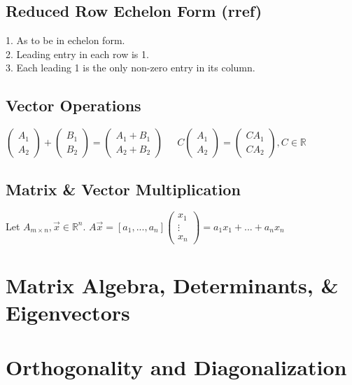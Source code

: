 \documentclass[5pt]{article}
\begin{document}
\begin{multicols}{2}
\subsection{Reduced Row Echelon Form (rref)}
1. As to be in echelon form. \\
2. Leading entry in each row is 1. \\
3. Each leading 1 is the only non-zero entry in its column. \\

\subsection{Vector Operations}
$\begin{pmatrix}A_1\\ A_2\end{pmatrix}+\begin{pmatrix}B_1\\ B_2\end{pmatrix}=\begin{pmatrix}A_1+B_1\\ A_2+B_2\end{pmatrix}\;\;\;\;$
$C\begin{pmatrix}A_1\\ A_2\end{pmatrix}=\begin{pmatrix}CA_1\\ CA_2\end{pmatrix}, C\in\mathbb{R}$

\subsection{Matrix \& Vector Multiplication}
Let $A_{m\times n}, \vec{x}\in\mathbb{R}^n$. $A\vec{x}=\left[a_1, ...,a_n\right]\begin{pmatrix}x_1\\ \vdots\\ x_n\end{pmatrix}=a_1x_1 + ... + a_nx_n$


\section{Matrix Algebra, Determinants, \& Eigenvectors}

\section{Orthogonality and Diagonalization}

\end{multicols}
\end{document}
